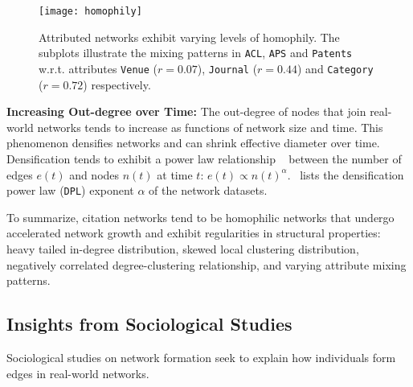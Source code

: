 
\begin{figure}
 \centering
 \texttt{[image: homophily]}
 \caption{
    Attributed networks exhibit varying levels of homophily. The subplots
    illustrate the mixing patterns in \texttt{ACL}, \texttt{APS} and \texttt{Patents}
    w.r.t. attributes \texttt{Venue} ($r=0.07$), \texttt{Journal} ($r=0.44$) and
    \texttt{Category} ($r=0.72$) respectively.
 }
 \label{fig:mixing}
 \vspace{-20pt}
\end{figure}

\textbf{Increasing Out-degree over Time:}
The out-degree of nodes that join real-world networks tends to increase as
functions of network size and time. This phenomenon densifies networks and
can shrink effective diameter over time. Densification tends to exhibit a power law
relationship ~\cite{leskovec2005graphs} between the number of edges $e(t)$ and
nodes $n(t)$ at time $t$: $e(t) \propto n(t)^{\alpha}$.~
lists the densification power law (\texttt{DPL}) exponent $\alpha$ of the
network datasets.

To summarize, citation networks tend to be homophilic networks that undergo
accelerated network growth and exhibit regularities in structural properties:
heavy tailed in-degree distribution, skewed local clustering distribution,
negatively correlated degree-clustering relationship, and varying attribute
mixing patterns.



\subsection{Insights from Sociological Studies}

Sociological studies on network formation seek to explain
how individuals form edges in real-world networks.


